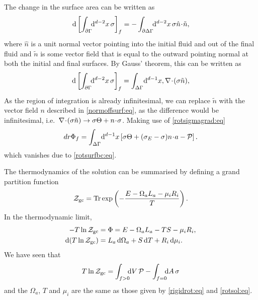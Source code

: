\documentclass[12pt]{article}
\newcommand{\ploc}{\mathcal{P}}
\newcommand{\mg}{\mu}
\newcommand{\gpf}{\mathcal{Z}_\mathrm{gc}}
\newcommand{\aint}{\int_{\p\Gamma}\!\!\dr^{d-2}x}
\newcommand{\dvint}{\int_{\Delta\Gamma}\!\dr^{d-1}x}
\newcommand{\daint}{\int_{\p\Delta\Gamma}\!\!\dr^{d-2}x}
\begin{document}
The change in the surface area can be written as
%
\begin{equation*}
  \dr\brk{\aint\,\sigma}_f = -\daint\,\sigma \hat{n}\cdt\tilde{n},
\end{equation*}
%
where $\hat{n}$ is a unit normal vector pointing into the initial fluid and out of the final fluid and $\tilde{n}$ is some vector field that is equal to the outward pointing normal at both the initial and final surfaces. By Gauss' theorem, this can be written as
%
\begin{equation*}
  \dr\brk{\aint\,\sigma}_f= \dvint, \nabla\cdt(\sigma\tilde{n}),
\end{equation*}
%
As the region of integration is already infinitesimal, we can replace $\tilde{n}$ with the vector field $n$ described in \eqref{normoffsurf:eq}, as the difference would be infinitesimal, i.e.\ $\nabla\!\cdot\!(\sigma\tilde{n}) \to \sigma\Theta + n\!\cdot\!\sigma$.
Making use of \eqref{rotsigmagrad:eq}
%
\begin{equation*}
  \\dr\Phi_f = \dvint\brk{\sigma\Theta + (\sigma_E-\sigma)n\cdt a - \ploc}.
\end{equation*}
%
which vanishes due to \eqref{rotsurfbc:eq}.

The thermodynamics of the solution can be summarised by defining a grand partition function
%
\begin{equation}\label{gpf:eq}
  \gpf = \Tr\exp\prn{-\frac{E -\Omega_a L_a  - \mg_i R_i}{T}}.
\end{equation}
%
In the thermodynamic limit,
%
\begin{equation}\label{gpftherm:eq}
  \begin{split}
    -T\ln\gpf &= \Phi = E -\Omega_a L_a - T S - \mg_i R_i, \\
    \dr(T\ln\gpf) &= L_a \,\dr \Omega_a + S \,\dr T + R_i \,\dr \mg_i.
  \end{split}
\end{equation}
%
We have seen that
%
\begin{equation}\label{gpfrot:eq}
  T\ln\gpf = \int_{f>0}\!\!\!\dr V \,\ploc - \int_{f=0}\!\!\!\dr A \,\sigma
\end{equation}
%
and the $\Omega_a$, $T$ and $\mg_i$ are the same as those given by \eqref{rigidrot:eq} and \eqref{rotsol:eq}.



\end{document}
